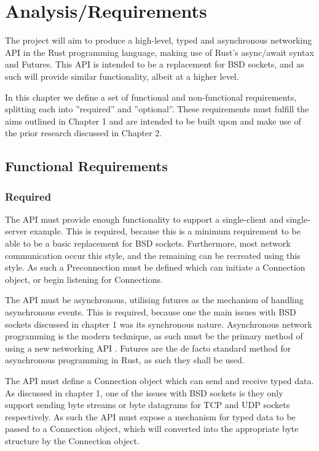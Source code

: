 \documentclass{l4proj}
\begin{document}
\chapter{Analysis/Requirements}
The project will aim to produce a high-level, typed and asynchronous networking API in the Rust programming language,
making use of Rust's async/await syntax and Futures.
This API is intended to be a replacement for BSD sockets, and as such will provide similar functionality, albeit at a
higher level.

In this chapter we define a set of functional and non-functional requirements, splitting each into ''required'' and
''optional''.
These requirements must fulfill the aims outlined in Chapter 1 and are intended to be built upon and make use of the
prior research discussed in Chapter 2.

\section{Functional Requirements}

\subsection{Required}

The API must provide enough functionality to support a single-client and single-server example.
This is required, because this is a minimum requirement to be able to be a basic replacement for BSD sockets.
Furthermore, most network communication occur this style, and the remaining can be recreated using this style.
As such a Preconnection must be defined which can initiate a Connection object, or begin listening for Connections.

The API must be asynchronous, utilising futures as the mechanism of handling asynchronous events.
This is required, because one the main issues with BSD sockets discussed in chapter 1 was its synchronous nature.
Asynchronous network programming is the modern technique, as such must be the primary method of using a new networking
API .
Futures are the de facto standard method for asynchronous programming in Rust, as such they shall be used.

The API must define a Connection object which can send and receive typed data.
As discussed in chapter 1, one of the issues with BSD sockets is they only support sending byte streams or byte
datagrams for TCP and UDP sockets respectively.
As such the API must expose a mechanism for typed data to be passed to a Connection object, which will converted into
the appropriate byte structure by the Connection object.
\end{document}
